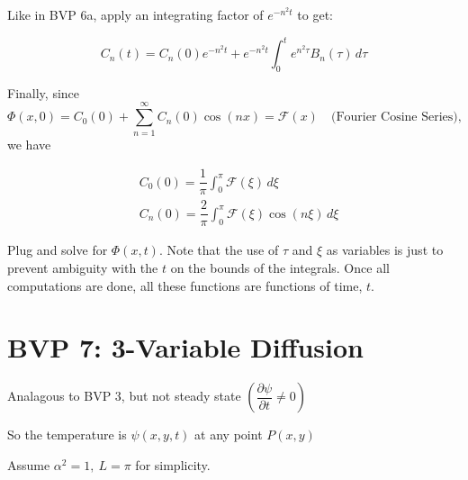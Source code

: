 \documentclass{report}
\begin{document}
Like in BVP 6a, apply an integrating factor of \(e^{-n^{2}t}\) to get:

$$
\boxed{C_{n}(t)=C_{n}(0)e^{-n^{2}t}+e^{-n^{2}t}\int_{0}^{t} e^{n^{2}\tau} B_{n}(\tau)\,d\tau}
$$

Finally, since
\[
\Phi(x, 0)=C_{0}(0)+\sum_{n=1}^{\infty} C_{n}(0) \cos(nx)=\mathcal{F}(x)
\quad \text{(Fourier Cosine Series)},
\]
we have

$$
\begin{aligned}
& \boxed{C_{0}(0)=\dfrac{1}{\pi}\int_{0}^{\pi} \mathcal{F}(\xi)\,d\xi} \\
& \boxed{C_{n}(0)=\dfrac{2}{\pi}\int_{0}^{\pi} \mathcal{F}(\xi)\cos(n\xi)\,d\xi}
\end{aligned}
$$

Plug and solve for $\Phi(x, t)$. Note that the use of $\tau$ and $\xi$ as variables is just to prevent ambiguity with the $t$ on the bounds of the integrals. Once all computations are done, all these functions are functions of time, $t$.

\section{BVP 7: 3-Variable Diffusion}

Analagous to BVP 3, but not steady state $\left(\dfrac{\partial \psi}{\partial t} \neq 0\right)$

So the temperature is $\psi(x, y, t)$ at any point $P(x, y)$

Assume $\alpha^{2}=1,\ L=\pi$ for simplicity.
\end{document}
